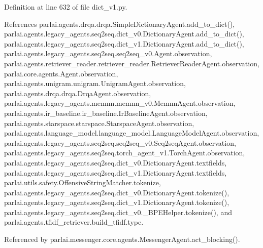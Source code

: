 Definition at line 632 of file dict\+\_\+v1.\+py.



References parlai.\+agents.\+drqa.\+drqa.\+Simple\+Dictionary\+Agent.\+add\+\_\+to\+\_\+dict(), parlai.\+agents.\+legacy\+\_\+agents.\+seq2seq.\+dict\+\_\+v0.\+Dictionary\+Agent.\+add\+\_\+to\+\_\+dict(), parlai.\+agents.\+legacy\+\_\+agents.\+seq2seq.\+dict\+\_\+v1.\+Dictionary\+Agent.\+add\+\_\+to\+\_\+dict(), parlai.\+agents.\+legacy\+\_\+agents.\+seq2seq.\+seq2seq\+\_\+v0.\+Agent.\+observation, parlai.\+agents.\+retriever\+\_\+reader.\+retriever\+\_\+reader.\+Retriever\+Reader\+Agent.\+observation, parlai.\+core.\+agents.\+Agent.\+observation, parlai.\+agents.\+unigram.\+unigram.\+Unigram\+Agent.\+observation, parlai.\+agents.\+drqa.\+drqa.\+Drqa\+Agent.\+observation, parlai.\+agents.\+legacy\+\_\+agents.\+memnn.\+memnn\+\_\+v0.\+Memnn\+Agent.\+observation, parlai.\+agents.\+ir\+\_\+baseline.\+ir\+\_\+baseline.\+Ir\+Baseline\+Agent.\+observation, parlai.\+agents.\+starspace.\+starspace.\+Starspace\+Agent.\+observation, parlai.\+agents.\+language\+\_\+model.\+language\+\_\+model.\+Language\+Model\+Agent.\+observation, parlai.\+agents.\+legacy\+\_\+agents.\+seq2seq.\+seq2seq\+\_\+v0.\+Seq2seq\+Agent.\+observation, parlai.\+agents.\+legacy\+\_\+agents.\+seq2seq.\+torch\+\_\+agent\+\_\+v1.\+Torch\+Agent.\+observation, parlai.\+agents.\+legacy\+\_\+agents.\+seq2seq.\+dict\+\_\+v0.\+Dictionary\+Agent.\+textfields, parlai.\+agents.\+legacy\+\_\+agents.\+seq2seq.\+dict\+\_\+v1.\+Dictionary\+Agent.\+textfields, parlai.\+utils.\+safety.\+Offensive\+String\+Matcher.\+tokenize, parlai.\+agents.\+legacy\+\_\+agents.\+seq2seq.\+dict\+\_\+v0.\+Dictionary\+Agent.\+tokenize(), parlai.\+agents.\+legacy\+\_\+agents.\+seq2seq.\+dict\+\_\+v1.\+Dictionary\+Agent.\+tokenize(), parlai.\+agents.\+legacy\+\_\+agents.\+seq2seq.\+dict\+\_\+v0.\+\_\+\+B\+P\+E\+Helper.\+tokenize(), and parlai.\+agents.\+tfidf\+\_\+retriever.\+build\+\_\+tfidf.\+type.



Referenced by parlai.\+messenger.\+core.\+agents.\+Messenger\+Agent.\+act\+\_\+blocking().

